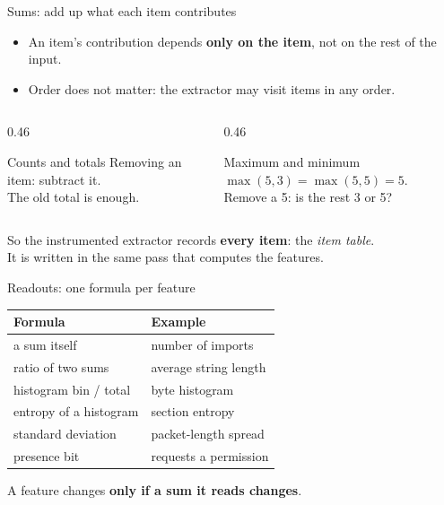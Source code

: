 \documentclass[aspectratio=169,11pt]{beamer}
\begin{document}
\begin{frame}{Sums: add up what each item contributes}
  \begin{itemize}
    \item An item's contribution depends \textbf{only on the item}, not on the rest of the input.
    \item Order does not matter: the extractor may visit items in any order.
  \end{itemize}
  \vfill
  \begin{columns}[T]
    \begin{column}{0.46\textwidth}
      \begin{exampleblock}{Counts and totals}
        Removing an item: subtract it.\\
        The old total is enough.
      \end{exampleblock}
    \end{column}
    \begin{column}{0.46\textwidth}
      \begin{alertblock}{Maximum and minimum}
        $\max(5,3) = \max(5,5) = 5$.\\
        Remove a 5: is the rest 3 or 5?
      \end{alertblock}
    \end{column}
  \end{columns}
  \vfill
  \begin{center}
    So the instrumented extractor records \textbf{every item}: the \emph{item table}.\\
    It is written in the same pass that computes the features.
  \end{center}
\end{frame}

\begin{frame}{Readouts: one formula per feature}
  \renewcommand{\arraystretch}{1.3}
  \begin{center}
    \begin{tabular}{@{}ll@{}}
      \toprule
      \textbf{Formula} & \textbf{Example} \\
      \midrule
      a sum itself & number of imports \\
      ratio of two sums & average string length \\
      histogram bin / total & byte histogram \\
      entropy of a histogram & section entropy \\
      standard deviation & packet-length spread \\
      presence bit & requests a permission \\
      \bottomrule
    \end{tabular}
  \end{center}
  \vfill
  \begin{center}
    A feature changes \textbf{only if a sum it reads changes}.
  \end{center}
\end{frame}
\end{document}
